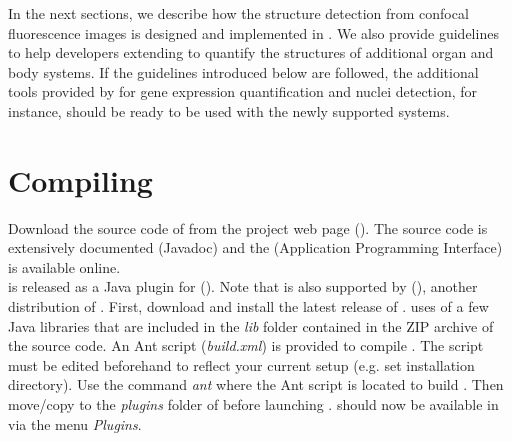 
In the next sections, we describe how the structure detection from confocal fluorescence images is designed and implemented in \wingj. We also provide guidelines to help developers extending \wingj to quantify the structures of additional organ and body systems. If the guidelines introduced below are followed, the additional tools provided by \wingj for gene expression quantification and nuclei detection, for instance, should be ready to be used with the newly supported systems.

\section{Compiling \wingj}
Download the source code of \wingj from the project web page (\wingjShortUrl). The source code is extensively documented (Javadoc) and the \wingjAPI (Application Programming Interface) is available online.\\

\wingj is released as a Java plugin for \ij (\ijWebsite). Note that \wingj is also supported by \fiji (\fijiWebsite), another distribution of \ij. First, download and install the latest release of \ij. \wingj uses of a few Java libraries that are included in the \textit{lib} folder contained in the ZIP archive of the source code. An Ant script (\textit{build.xml}) is provided to compile \wingj. The script must be edited beforehand to reflect your current setup (e.g. set \ij installation directory). Use the command \textit{ant} where the Ant script is located to build \wingjJar. Then move/copy \wingjJar to the \textit{plugins} folder of \ij before launching \ij. \wingj should now be available in \ij via the menu \textit{Plugins}.\\


